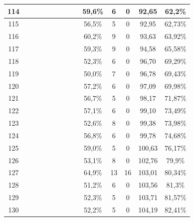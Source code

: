 \begin{longtable}{|c|c|c|c|c|c|c|c|c|c|c|c|c|c|}
114 &  \x    & \x    & \x    &       &       & \x\m  & \x\m  &       & 59,6\% &  6  & 0  & 92,65 & 62,2\% \\ \hline
115 &  \x    & \x    &       & \x    & \x    & \x    &       & \x    & 56,5\% &  5  & 0  & 92,95 & 62,73\% \\ \hline
116 &  \x    & \x    & \x    &       &       &       & \x\m  &       & 60,2\% &  9  & 0  & 93,63 & 63,92\% \\ \hline
117 &  \x    & \x    & \x    &       &       & \x\m  & \x    &       & 59,3\% &  9  & 0  & 94,58 & 65,58\% \\ \hline
118 &  \x    & \x    &       &       &       &       &       & \x    & 52,3\% &  6  & 0  & 96,70 & 69,29\% \\ \hline
119 &  \x    & \x    &       &       &       & \x\m  &       &       & 50,0\% &  7  & 0  & 96,78 & 69,43\% \\ \hline
120 &  \x    & \x    &       &       & \x    &       &       & \x    & 57,2\% &  6  & 0  & 97,09 & 69,98\% \\ \hline
121 &  \x    & \x    &       & \x    & \x    & \x    & \x    &       & 56,7\% &  5  & 0  & 98,17 & 71,87\% \\ \hline
122 &  \x    & \x    &       &       & \x    & \x    &       & \x    & 57,1\% &  6  & 0  & 99,10 & 73,49\% \\ \hline
123 &  \x    & \x    &       &       &       &       & \x    &       & 52,6\% &  8  & 0  & 99,38 & 73,98\% \\ \hline
124 &  \x    & \x    &       &       & \x    &       & \x    &       & 56,8\% &  6  & 0  & 99,78 & 74,68\% \\ \hline
125 &  \x    & \x    & \x    &       &       & \x\m  &       & \x    & 59,0\% &  5  & 0  & 100,63 & 76,17\% \\ \hline
126 &  \x    & \x    &       & \x    &       &       &       & \x\m  & 53,1\% &  8  & 0  & 102,76 & 79,9\% \\ \hline
127 &  \x    & \x    &       & \x    & \x\m  &       & \x\m  &       & 64,9\% &  13 & 16 & 103,01 & 80,34\% \\ \hline
128 &  \x    & \x    &       &       &       & \x    & \x    &       & 51,2\% &  6  & 0  & 103,56 & 81,3\% \\ \hline
129 &  \x    & \x    &       &       &       & \x    &       & \x    & 52,3\% &  5  & 0  & 103,71 & 81,57\% \\ \hline
130 &  \x    & \x    &       & \x    &       & \x    &       & \x    & 52,2\% &  5  & 0  & 104,19 & 82,41\% \\ \hline

\end{longtable}
